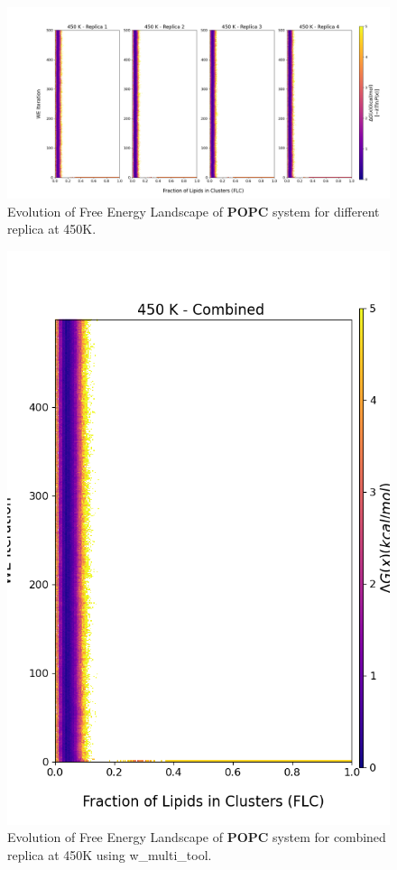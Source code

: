 \documentclass{biophys-new}
\begin{document}
\begin{figure}[hbt!]
\centering
\includegraphics[width=1.1\linewidth]{all_plots/ClusterLipids2Total/DPPC_POPC_CHOL/450K/Evolution_POPC_450_ClusterLipids2Total.png}
\caption{Evolution of Free Energy Landscape of \textbf{POPC} system for different replica at 450K.}
\label{fig:view}

\end{figure}

\begin{figure}[hbt!]
\centering
\includegraphics[width=0.8\linewidth]{all_plots/ClusterLipids2Total/DPPC_POPC_CHOL/450K/Evolution_POPC_MULTI__450_ClusterLipids2Total.png}
\caption{Evolution of Free Energy Landscape of \textbf{POPC} system for combined replica at 450K using w\_multi\_tool.}
\label{fig:view}

\end{figure}

\end{document}
